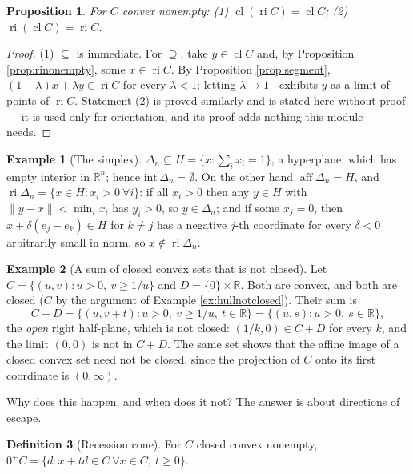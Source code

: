 \documentclass[11pt,a4paper]{article}
\theoremstyle{definition}
\newtheorem{definition}{Definition}
\newtheorem{example}[definition]{Example}
\theoremstyle{plain}
\newtheorem{proposition}[theorem]{Proposition}
\theoremstyle{remark}
\newcommand{\R}{\mathbb{R}}
\newcommand{\norm}[1]{\lVert #1\rVert}
\DeclareMathOperator{\aff}{aff}
\DeclareMathOperator{\ri}{ri}
\DeclareMathOperator{\cl}{cl}
\newcommand{\Simplex}{\Delta}
\begin{document}
\begin{proposition}
\label{prop:ricl}
For $C$ convex nonempty: (1) $\cl(\ri C)=\cl C$; (2) $\ri(\cl C)=\ri C$.
\end{proposition}

\begin{proof}
(1) $\subseteq$ is immediate. For $\supseteq$, take $y\in\cl C$ and, by Proposition
\ref{prop:rinonempty}, some $x\in\ri C$. By Proposition \ref{prop:segment},
$(1-\lambda)x+\lambda y\in\ri C$ for every $\lambda<1$; letting $\lambda\to1^-$ exhibits $y$ as
a limit of points of $\ri C$. Statement (2) is proved similarly and is stated here without proof
--- it is used only for orientation, and its proof adds nothing this module needs.
\end{proof}

\begin{example}[The simplex]
\label{ex:simplexri}
$\Simplex_n\subseteq H=\{x:\sum_ix_i=1\}$, a hyperplane, which has empty interior in $\R^n$;
hence $\mathrm{int}\,\Simplex_n=\emptyset$. On the other hand $\aff\Simplex_n=H$, and
$\ri\Simplex_n=\{x\in H:x_i>0\ \forall i\}$: if all $x_i>0$ then any $y\in H$ with
$\norm{y-x}<\min_ix_i$ has $y_i>0$, so $y\in\Simplex_n$; and if some $x_j=0$, then
$x+\delta(e_j-e_k)\in H$ for $k\ne j$ has a negative $j$-th coordinate for every $\delta<0$
arbitrarily small in norm, so $x\notin\ri\Simplex_n$.
\end{example}

\begin{example}[A sum of closed convex sets that is not closed]
\label{ex:notclosed}
Let $C=\{(u,v):u>0,\ v\ge1/u\}$ and $D=\{0\}\times\R$. Both are convex, and both are closed
($C$ by the argument of Example \ref{ex:hullnotclosed}). Their sum is
\[
C+D=\{(u,v+t):u>0,\ v\ge1/u,\ t\in\R\}=\{(u,s):u>0,\ s\in\R\},
\]
the \emph{open} right half-plane, which is not closed: $(1/k,0)\in C+D$ for every $k$, and the
limit $(0,0)$ is not in $C+D$. The same set shows that the affine image of a closed convex set
need not be closed, since the projection of $C$ onto its first coordinate is $(0,\infty)$.
\end{example}

Why does this happen, and when does it not? The answer is about directions of escape.

\begin{definition}[Recession cone]
\label{def:recession}
For $C$ closed convex nonempty, $0^+C=\{d:x+td\in C\ \forall x\in C,\ t\ge0\}$.
\end{definition}
\end{document}
